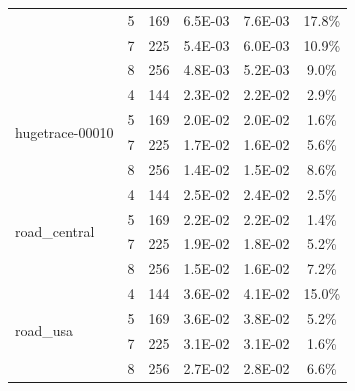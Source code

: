 \documentclass[conference, 10ppt]{IEEEtran}
\begin{document}
\begin{table}[htb]
\begin{tabular}[c]{| l | c | c | c | c | c |}
  &  5  &  169  &  6.5E-03  &  7.6E-03  &  17.8\% \\ \cline{2-6}
  &  7  &  225  &  5.4E-03  &  6.0E-03  &  10.9\% \\ \cline{2-6}
  &  8  &  256  &  4.8E-03  &  5.2E-03  &  9.0\% \\ \hline
\multirow{4}{*}{hugetrace-00010}  &  4  &  144  &  2.3E-02  &  2.2E-02  &  2.9\% \\ \cline{2-6}
  &  5  &  169  &  2.0E-02  &  2.0E-02  &  1.6\% \\ \cline{2-6}
  &  7  &  225  &  1.7E-02  &  1.6E-02  &  5.6\% \\ \cline{2-6}
  &  8  &  256  &  1.4E-02  &  1.5E-02  &  8.6\% \\ \hline
\multirow{4}{*}{road\_central}  &  4  &  144  &  2.5E-02  &  2.4E-02  &  2.5\% \\ \cline{2-6}
  &  5  &  169  &  2.2E-02  &  2.2E-02  &  1.4\% \\ \cline{2-6}
  &  7  &  225  &  1.9E-02  &  1.8E-02  &  5.2\% \\ \cline{2-6}
  &  8  &  256  &  1.5E-02  &  1.6E-02  &  7.2\% \\ \hline
\multirow{4}{*}{road\_usa}  &  4  &  144  &  3.6E-02  &  4.1E-02  &  15.0\% \\ \cline{2-6}
  &  5  &  169  &  3.6E-02  &  3.8E-02  &  5.2\% \\ \cline{2-6}
  &  7  &  225  &  3.1E-02  &  3.1E-02  &  1.6\% \\ \cline{2-6}
\  &  8  &  256  &  2.7E-02  &  2.8E-02  &  6.6\% \\ \hline
\end{tabular}
\end{table}
\end{document}

